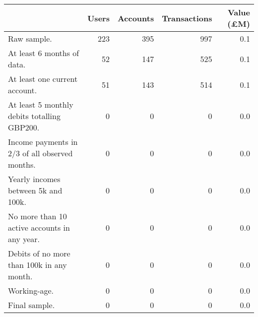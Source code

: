 \begin{tabular}{lrrrr}
\toprule
                                               & Users & Accounts & Transactions & Value (\pounds M) \\
\midrule
                                   Raw sample. &   223 &      395 &          997 &               0.1 \\
                    At least 6 months of data. &    52 &      147 &          525 &               0.1 \\
                 At least one current account. &    51 &      143 &          514 &               0.1 \\
   At least 5 monthly debits totalling GBP200. &     0 &        0 &            0 &               0.0 \\
Income payments in 2/3 of all observed months. &     0 &        0 &            0 &               0.0 \\
           Yearly incomes between 5k and 100k. &     0 &        0 &            0 &               0.0 \\
  No more than 10 active accounts in any year. &     0 &        0 &            0 &               0.0 \\
     Debits of no more than 100k in any month. &     0 &        0 &            0 &               0.0 \\
                                  Working-age. &     0 &        0 &            0 &               0.0 \\
                                 Final sample. &     0 &        0 &            0 &               0.0 \\
\bottomrule
\end{tabular}
